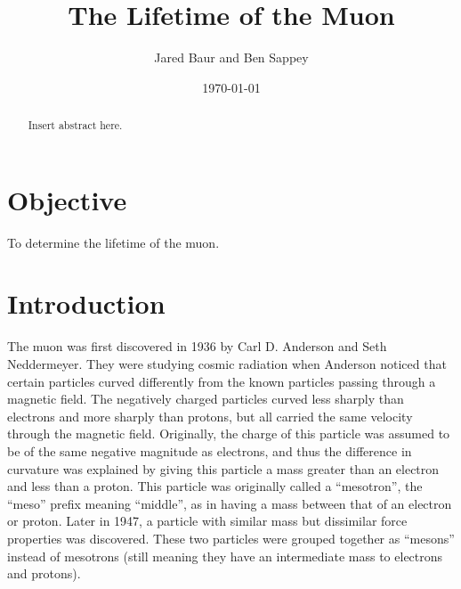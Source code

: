 \documentclass[%
 aip,
 amsmath,amssymb,
 reprint,%
floatfix,
]{revtex4-1}
\begin{document}

\title[]{The Lifetime of the Muon}

\author{Jared Baur and Ben Sappey}

\date{\today}%


\begin{abstract}

	Insert abstract here.

\end{abstract}

\maketitle


\onecolumngrid

\section{\label{sec:level1}Objective}

To determine the lifetime of the muon.

\section{\label{sec:level2}Introduction}

The muon was first discovered in 1936 by Carl D. Anderson and Seth Neddermeyer. They were studying cosmic radiation when Anderson noticed that certain particles curved differently from the known particles passing through a magnetic field. The negatively charged particles curved less sharply than electrons and more sharply than protons, but all carried the same velocity through the magnetic field. Originally, the charge of this particle was assumed to be of the same negative magnitude as electrons, and thus the difference in curvature was explained by giving this particle a mass greater than an electron and less than a proton. This particle was originally called a “mesotron”, the “meso” prefix meaning “middle”, as in having a mass between that of an electron or proton. Later in 1947, a particle with similar mass but dissimilar force properties was discovered. These two particles were grouped together as “mesons” instead of mesotrons (still meaning they have an intermediate mass to electrons and protons).
\end{document}
